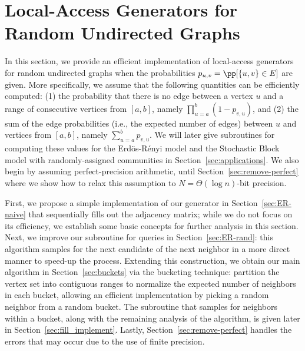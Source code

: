 \section{Local-Access Generators for Random Undirected Graphs}\label{sec:undirected}

In this section, we provide an efficient implementation of local-access generators for random undirected graphs when the probabilities $p_{u,v} = \pp[\{u,v\} \in E]$ are given. More specifically, we assume that the following quantities can be efficiently computed:
(1) the probability that there is no edge between a vertex $u$ and a range of consecutive vertices from $[a,b]$, namely $\prod_{u=a}^b (1-p_{v,u})$, and
(2) the sum of the edge probabilities (i.e., the expected number of edges) between $u$ and vertices from $[a,b]$, namely $\sum_{u=a}^b p_{v,u}$. We will later give subroutines for computing these values for the Erd\"{o}s-R\'{e}nyi model and the Stochastic Block model with randomly-assigned communities in Section~\ref{sec:applications}. We also begin by assuming perfect-precision arithmetic, until Section~\ref{sec:remove-perfect} where we show how to relax this assumption to $N = \Theta(\log n)$-bit precision.

First, we propose a simple implementation of our generator in Section~\ref{sec:ER-naive} that sequentially fills out the adjacency matrix; while we do not focus on its efficiency, we establish some basic concepts for further analysis in this section. Next, we improve our subroutine for  queries in Section~\ref{sec:ER-rand}: this algorithm samples for the next candidate of the next neighbor in a more direct manner to speed-up the process. Extending this construction, we obtain our main algorithm in Section~\ref{sec:buckets} via the bucketing technique: partition the vertex set into contiguous ranges to normalize the expected number of neighbors in each bucket, allowing an efficient  implementation by picking a random neighbor from a random bucket. The subroutine that samples for neighbors within a bucket, along with the remaining analysis of the algorithm, is given later in Section~\ref{sec:fill_implement}. Lastly, Section~\ref{sec:remove-perfect} handles the errors that may occur due to the use of finite precision.

\iffalse
{\color{blue}
Alternatively, we provide an implementation for these two models with a deterministic performance guarantee in Section~\ref{sec:ER-det}.
In this setting, introducing the \func{vertex-pair} queries results in an amortized guarantee on the run-time.
The deterministic guarantee comes at the cost of more complicated data-structures
(we use a two-level nested interval tree and binary search tree).
}
\fi



